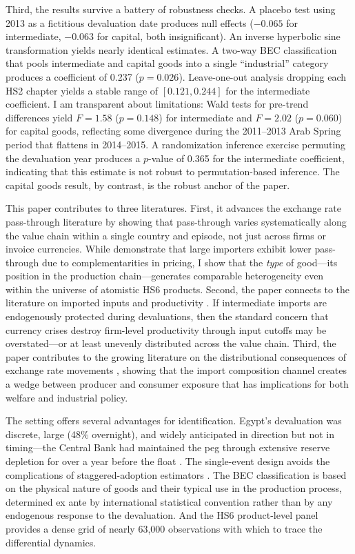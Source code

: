 \documentclass[12pt]{article}
\begin{document}
Third, the results survive a battery of robustness checks. A placebo test using 2013 as a fictitious devaluation date produces null effects ($-0.065$ for intermediate, $-0.063$ for capital, both insignificant). An inverse hyperbolic sine transformation yields nearly identical estimates. A two-way BEC classification that pools intermediate and capital goods into a single ``industrial'' category produces a coefficient of 0.237 ($p=0.026$). Leave-one-out analysis dropping each HS2 chapter yields a stable range of $[0.121, 0.244]$ for the intermediate coefficient. I am transparent about limitations: Wald tests for pre-trend differences yield $F=1.58$ ($p=0.148$) for intermediate and $F=2.02$ ($p=0.060$) for capital goods, reflecting some divergence during the 2011--2013 Arab Spring period that flattens in 2014--2015. A randomization inference exercise permuting the devaluation year produces a $p$-value of 0.365 for the intermediate coefficient, indicating that this estimate is not robust to permutation-based inference. The capital goods result, by contrast, is the robust anchor of the paper.

This paper contributes to three literatures. First, it advances the exchange rate pass-through literature \citep{goldberg1997goods, amiti2014importers, gopinath2010currency} by showing that pass-through varies systematically along the value chain within a single country and episode, not just across firms or invoice currencies. While \citet{amiti2014importers} demonstrate that large importers exhibit lower pass-through due to complementarities in pricing, I show that the \textit{type} of good---its position in the production chain---generates comparable heterogeneity even within the universe of atomistic HS6 products. Second, the paper connects to the literature on imported inputs and productivity \citep{halpern2015imported, goldberg2010imported, amiti2007trade}. If intermediate imports are endogenously protected during devaluations, then the standard concern that currency crises destroy firm-level productivity through input cutoffs may be overstated---or at least unevenly distributed across the value chain. Third, the paper contributes to the growing literature on the distributional consequences of exchange rate movements \citep{cravino2017deflating, fajgelbaum2020return}, showing that the import composition channel creates a wedge between producer and consumer exposure that has implications for both welfare and industrial policy.

The setting offers several advantages for identification. Egypt's devaluation was discrete, large (48\% overnight), and widely anticipated in direction but not in timing---the Central Bank had maintained the peg through extensive reserve depletion for over a year before the float \citep{imf2017egypt}. The single-event design avoids the complications of staggered-adoption estimators \citep{callaway2021difference, sun2021estimating}. The BEC classification is based on the physical nature of goods and their typical use in the production process, determined ex ante by international statistical convention rather than by any endogenous response to the devaluation. And the HS6 product-level panel provides a dense grid of nearly 63,000 observations with which to trace the differential dynamics.
\end{document}
